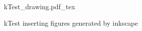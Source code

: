 \documentclass[12pt]{article}
\newcommand{\incfig}[1]{%
    \def\svgwidth{\columnwidth}
    {#1.pdf_tex}
}
\begin{document}

\begin{figure}[H]
    \centering
    \incfig{kTest_drawing}
    \caption{kTest inserting figures generated by inkscape}
    \label{fig:kTest_drawing}
\end{figure}
\end{document}
